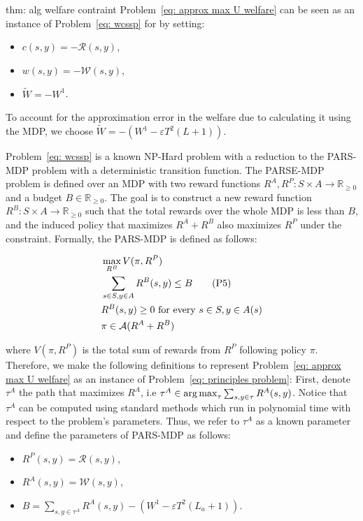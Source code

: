 \begin{proofof}{thm: alg welfare contraint}
Problem~\ref{eq: approx max U welfare} can be seen as an instance of Problem~\eqref{eq: wcssp} for by setting:
\begin{itemize}
\item $c(s, y) = -\mathcal{R}(s, y)$,
\item $w(s, y) = -\mathcal{W}(s, y)$,
\item $\tilde{W} = -W^1$.
\end{itemize}

To account for the approximation error in the welfare due to calculating it using the MDP, we choose $\tilde{W} = - \left(W^1 - \varepsilon T^2 (L+1)\right)$.

Problem~\eqref{eq: wcssp} is a known NP-Hard problem with a reduction to the PARS-MDP problem \cite{ben2024principal} with a deterministic transition function. The PARSE-MDP problem is defined over an MDP with two reward functions $R^A, R^P : S \times A \rightarrow \mathbb{R}_{\geq 0}$ and a budget $B \in \mathbb{R}_{\geq 0}$. The goal is to construct a new reward function $R^B : S \times A \rightarrow \mathbb{R}_{\geq 0}$ such that the total rewards over the whole MDP is less than $B$, and the induced policy that maximizes $R^A + R^B$ also maximizes $R^P$ under the constraint. Formally, the PARS-MDP is defined as follows:

\begin{align}
& \nonumber \max_{R^B}{V(\pi, R^P)} \\
&  \sum_{s\in S, y\in A}{R^B(s, y)} \leq B \label{eq: principles problem}  \tag{P5}\\ 
& \nonumber  {R^B(s, y) \geq 0} \textnormal{ for every } s\in S, y\in A(s) \\
& \nonumber  \pi \in \mathcal{A}(R^A+R^B)
\end{align}

where $V(\pi, R^P)$ is the total sum of rewards from $R^P$ following policy $\pi$. Therefore, we make the following definitions to represent Problem~\eqref{eq: approx max U welfare} as an instance of Problem~\eqref{eq: principles problem}: First, denote $\tau^A$ the path that maximizes $R^A$, i.e $\tau^A \in \operatorname*{arg\,max}_{\tau} \sum_{s, y \in \tau} R^A(s, y)$. Notice that $\tau^A$ can be computed using standard methods which run in polynomial time with respect to the problem's parameters. Thus, we refer to $\tau^A$ as a known parameter and define the parameters of PARS-MDP as follows:

\begin{itemize}
\item $R^P(s, y) = \mathcal{R}(s, y)$,
\item $R^A(s, y) = \mathcal{W}(s, y)$,
\item $B = \sum_{s, y \in \tau^A} R^A(s, y) - \left(W^1 - \varepsilon T^2 (L_a + 1)\right)$.
\end{itemize}


\end{proofof}
